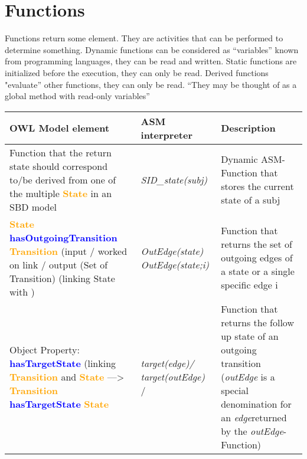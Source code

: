 \section{Functions}

Functions return some element. They are activities that can be performed to determine something.
Dynamic functions can be considered as “variables” known from programming languages, they can be read and written.
Static functions are initialized before the execution, they can only be read.
Derived functions "evaluate” other functions, they can only be read. “They may be thought of as a global method with read-only variables” 

\begin{landscape}
	\begin {longtable} {| p{} | p{} | p{}|}
	\hline
	OWL Model element &   ASM interpreter & Description\\
	\toprule
	\endhead
	\hline
	
	Function that the return state should correspond to/be derived from one of the multiple \textcolor{orange}{\textbf{State }}in an SBD model
	& \textit{SID\_state(subj)} 
	&  Dynamic ASM-Function that stores the current state of a subj
	\\
	\hline
	
	\textcolor{orange}{\textbf{State }} \textcolor{blue}{\textbf{hasOutgoingTransition }} \textcolor{orange}{\textbf{Transition }}  \newline
	(input / worked on link  / output (Set of Transition)
	(linking State with )
	& \textit{OutEdge(state) \newline
		OutEdge(state;i)}
	& Function that returns the set of outgoing edges of a state or a single specific edge i
	\\
	\hline
	
	Object Property: \textcolor{blue}{\textbf{hasTargetState}}
	(linking \textcolor{orange}{\textbf{Transition}} and \textcolor{orange}{\textbf{State}} --->\newline
	 \textcolor{orange}{\textbf{Transition  }}  \textcolor{blue}{\textbf{hasTargetState }} \textcolor{orange}{\textbf{State}}
	& \textit{target(edge)/ \newline
	target(outEdge)} /
	&  Function that returns the follow up state of an outgoing transition (\textit{outEdge} is a special denomination for an \textit{edge}returned by the \textit{outEdge}-Function)
	\\
	\hline
	

\end{longtable}
\end{landscape}
